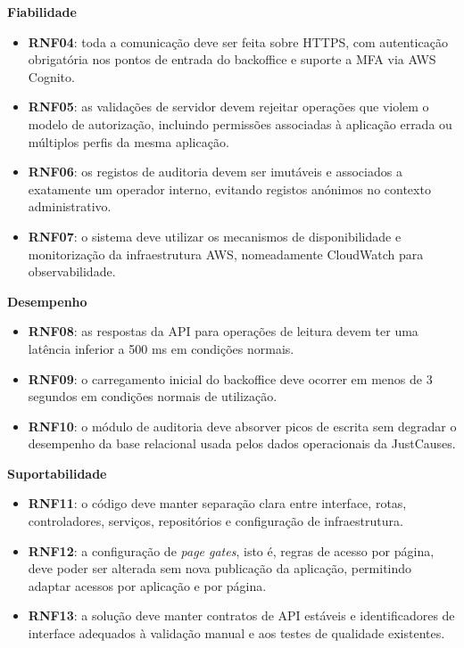 \noindent\textbf{Fiabilidade}
\begin{itemize}
  \item \textbf{RNF04}: toda a comunicação deve ser feita sobre HTTPS, com autenticação obrigatória nos pontos de entrada do backoffice e suporte a \gls{MFA} via AWS Cognito.
  \item \textbf{RNF05}: as validações de servidor devem rejeitar operações que violem o modelo de autorização, incluindo permissões associadas à aplicação errada ou múltiplos perfis da mesma aplicação.
  \item \textbf{RNF06}: os registos de auditoria devem ser imutáveis e associados a exatamente um operador interno, evitando registos anónimos no contexto administrativo.
  \item \textbf{RNF07}: o sistema deve utilizar os mecanismos de disponibilidade e monitorização da infraestrutura AWS, nomeadamente CloudWatch para observabilidade.
\end{itemize}

\noindent\textbf{Desempenho}
\begin{itemize}
  \item \textbf{RNF08}: as respostas da \gls{API} para operações de leitura devem ter uma latência inferior a 500 ms em condições normais.
  \item \textbf{RNF09}: o carregamento inicial do backoffice deve ocorrer em menos de 3 segundos em condições normais de utilização.
  \item \textbf{RNF10}: o módulo de auditoria deve absorver picos de escrita sem degradar o desempenho da base relacional usada pelos dados operacionais da JustCauses.
\end{itemize}

\noindent\textbf{Suportabilidade}
\begin{itemize}
  \item \textbf{RNF11}: o código deve manter separação clara entre interface, rotas, controladores, serviços, repositórios e configuração de infraestrutura.
  \item \textbf{RNF12}: a configuração de \textit{page gates}, isto é, regras de acesso por página, deve poder ser alterada sem nova publicação da aplicação, permitindo adaptar acessos por aplicação e por página.
  \item \textbf{RNF13}: a solução deve manter contratos de \gls{API} estáveis e identificadores de interface adequados à validação manual e aos testes de qualidade existentes.
\end{itemize}

